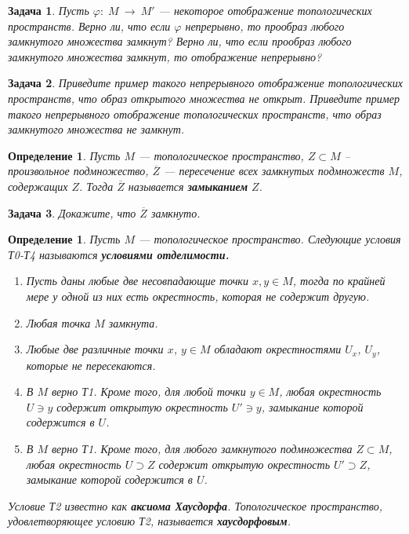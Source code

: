 \documentclass[12pt]{book}
\newcommand{\arrow}{{\:\longrightarrow\:}}
\renewcommand{\phi}{\varphi}
\theoremstyle{upshape}
\newtheorem{zadacha}{Задача}[chapter]
\theoremstyle{generic}
\newtheorem{opredelenie}[teorema]{Определение}
\theoremstyle{upshapenonumber}
\renewcommand{\labelenumi}{\ralph{enumi}.}
\newcommand{\следствие}{%
     \refstepcounter{teorema}
     {\noindent\bf Следствие \thechapter.\arabic{teorema}:\ }}
\newcommand{\пример}{%
     \refstepcounter{teorema}
     {\noindent\bf Пример \thechapter.\arabic{teorema}:\ }}
\newcommand{\лемма}{%
     \refstepcounter{teorema}
     {\noindent\bf Лемма \thechapter.\arabic{teorema}:\ }}
\newcommand{\теорема}{%
     \refstepcounter{teorema}
     {\noindent\bf Теорема \thechapter.\arabic{teorema}:\ }}
\newcommand{\утверждение}{%
     \refstepcounter{teorema}
     {\noindent\bf Утверждение \thechapter.\arabic{teorema}:\ }}
\begin{document}
{\begin{zadacha} 
Пусть $\phi:\; M \arrow M'$ --- некоторое отображение топологических
пространств.  Верно ли, что если $\phi$ непрерывно, то прообраз
любого замкнутого множества замкнут?  Верно ли, что если прообраз
любого замкнутого множества замкнут, то отображение непрерывно?
\end{zadacha}

\begin{zadacha}
Приведите пример такого непрерывного отображение топологических
пространств, что образ открытого множества не открыт. Приведите
пример такого непрерывного отображение топологических пространств,
что образ замкнутого множества не замкнут.
\end{zadacha}

\begin{opredelenie}
Пусть $M$ --- топологическое пространство, $Z\subset M$ --
произвольное подмножество, $\overline{Z}$ --- пересечение всех
замкнутых подмножеств $M$, содержащих $Z$.  Тогда $\overline{Z}$
называется {\bf замыканием} $Z$.
\end{opredelenie}

\begin{zadacha}
Докажите, что $\overline Z$ замкнуто.
\end{zadacha}

\begin{opredelenie}
Пусть $M$ --- топологическое пространство. Следующие условия Т0-Т4
называются {\bf условиями отделимости.}
\begin{enumerate}
\renewcommand{\labelenumi}{{\bf T\arabic{enumi}.}}
\setcounter{enumi}{-1}
\item Пусть даны любые две несовпадающие
точки $x,y \in M$, тогда по крайней мере
  у одной из них есть окрестность, которая не содержит другую.

\item Любая точка $M$ замкнута.

\item 
Любые две различные точки $x$, $y\in M$ обладают окрестностями
$U_x$, $U_y$, которые не пересекаются.

\item В $M$ верно Т1. Кроме того,
для любой точки $y\in M$, любая окрестность $U\ni y$ содержит
открытую окрестность $U'\ni y$, замыкание которой содержится в $U$.

\item  В $M$ верно Т1. Кроме того,
для любого замкнутого подмножества $Z\subset M$, любая окрестность
$U\supset Z$ содержит открытую окрестность $U'\supset Z$, замыкание
которой содержится в $U$.
\end{enumerate}
Условие Т2 известно как {\bf аксиома Хаусдорфа}. Топологическое
пространство, удовлетворяющее условию Т2, называется {\bf
хаусдорфовым}.
\end{opredelenie}

}
\end{document}
